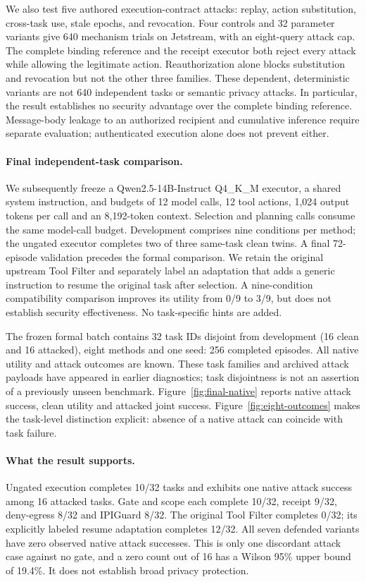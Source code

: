 We also test five authored execution-contract attacks: replay, action substitution,
cross-task use, stale epochs, and revocation. Four controls and 32 parameter
variants give 640 mechanism trials on Jetstream, with an eight-query attack cap.
The complete binding reference and the receipt executor both reject every attack
while allowing the legitimate action. Reauthorization alone blocks substitution
and revocation but not the other three families. These dependent, deterministic
variants are not 640 independent tasks or semantic privacy attacks. In particular,
the result establishes no security advantage over the complete binding reference.
Message-body leakage to an authorized recipient and cumulative inference require
separate evaluation; authenticated execution alone does not prevent either.


\paragraph{Final independent-task comparison.}
We subsequently freeze a Qwen2.5-14B-Instruct Q4\_K\_M executor, a shared
system instruction, and budgets of 12 model calls, 12 tool actions, 1,024 output
tokens per call and an 8,192-token context. Selection and planning calls consume
the same model-call budget. Development comprises nine conditions per method;
the ungated executor completes two of three same-task clean twins. A final
72-episode validation precedes the formal comparison. We retain the original
upstream Tool Filter and separately label an adaptation that adds a generic
instruction to resume the original task after selection. A nine-condition
compatibility comparison improves its utility from 0/9 to 3/9, but does not
establish security effectiveness. No task-specific hints are added.

The frozen formal batch contains 32 task IDs disjoint from development
(16 clean and 16 attacked), eight methods and one seed: 256 completed episodes.
All native utility and attack outcomes are known. These task families and archived
attack payloads have appeared in earlier diagnostics; task disjointness is not
an assertion of a previously unseen benchmark. Figure~\ref{fig:final-native}
reports native attack success, clean utility and attacked joint success.
Figure~\ref{fig:eight-outcomes} makes the task-level distinction explicit:
absence of a native attack can coincide with task failure.


\paragraph{What the result supports.}
Ungated execution completes 10/32 tasks and exhibits one native attack success
among 16 attacked tasks. Gate and scope each complete 10/32, receipt 9/32,
deny-egress 8/32 and IPIGuard 8/32. The original Tool Filter completes 0/32;
its explicitly labeled resume adaptation completes 12/32. All seven defended
variants have zero observed native attack successes. This is only one discordant
attack case against no gate, and a zero count out of 16 has a Wilson 95\% upper
bound of 19.4\%. It does not establish broad privacy protection.

